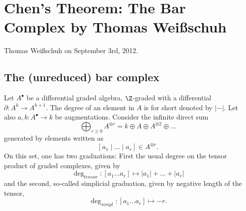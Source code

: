 \chapter*{Chen's Theorem: The Bar Complex by Thomas Wei{\ss}schuh}

Thomas Wei\ss schuh on September 3rd, 2012.


\section{The (unreduced) bar complex}

Let $A^{\bullet}$ be a differential graded algebra, $\Z$-graded with a differential $\partial : A^k \to A^{k+1}$. The degree of an element in $A$ is for short denoted by $|-|$. 
Let also $a, b : A^{\bullet} \to k$ be augmentations. 
Consider the infinite direct sum 
\[
\bigoplus_{r \geq 0} A^{\otimes r} = k \oplus A \oplus A^{\otimes 2} \oplus \ldots
\]
generated by elements written as 
\[ [a_1 \mid \ldots \mid a_r] \in A^{\otimes r}. \]
On this set, one has two graduations: First the usual degree on the tensor product of graded complexes, given by 
\[ \deg_{tensor} : [a_1 \ldots a_r] \mapsto |a_1| + \ldots + |a_r| \] %
and the second, so-called simplicial graduation, given by negative length of the tensor,
\[ \deg_{simpl} : [a_1 \ldots a_r] \mapsto -r. \]


